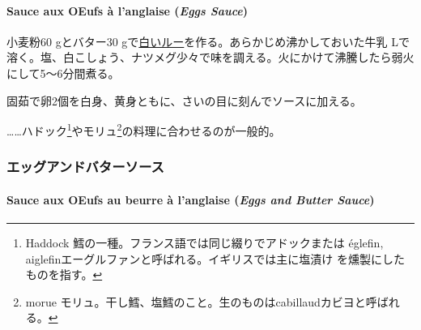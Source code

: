 \begin{recette}
\hypertarget{eggs-sauce}{%
\paragraph{\texorpdfstring{Sauce aux OEufs à l'anglaise (\emph{Eggs
Sauce})}{Sauce aux OEufs à l'anglaise (Eggs Sauce)}}\label{eggs-sauce}}


小麦粉60 gとバター30
gで\protect\hyperlink{roux-blanc}{白いルー}を作る。あらかじめ沸かしておいた牛乳\undemi{}
Lで溶く。塩、白こしょう、ナツメグ少々で味を調える。火にかけて沸騰したら弱火にして5〜6分間煮る。

固茹で卵2個を白身、黄身ともに、さいの目に刻んでソースに加える。

\ldots{}\ldots{}ハドック\footnote{Haddock
  鱈の一種。フランス語では同じ綴りでアドックまたは églefin,
  aiglefinエーグルファンと呼ばれる。イギリスでは主に塩漬け
  を燻製にしたものを指す。}やモリュ\footnote{morue
  モリュ。干し鱈、塩鱈のこと。生のものはcabillaudカビヨと呼ばれる。}の料理に合わせるのが一般的。

\maeaki

\hypertarget{ux30a8ux30c3ux30b0ux30a2ux30f3ux30c9ux30d0ux30bfux30fcux30bdux30fcux30b9}{%
\subsubsection{エッグアンドバターソース}\label{ux30a8ux30c3ux30b0ux30a2ux30f3ux30c9ux30d0ux30bfux30fcux30bdux30fcux30b9}}

\hypertarget{eggs-and-butter-sauce}{%
\paragraph{\texorpdfstring{Sauce aux OEufs au beurre à l'anglaise
(\emph{Eggs and Butter
Sauce})}{Sauce aux OEufs au beurre à l'anglaise (Eggs and Butter Sauce)}}\label{eggs-and-butter-sauce}}


\end{recette}
